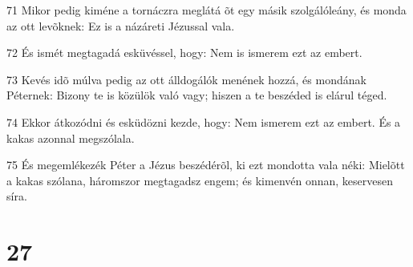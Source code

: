 \par 71 Mikor pedig kiméne a tornáczra meglátá õt egy másik szolgálóleány, és monda az ott levõknek: Ez is a názáreti Jézussal vala.
\par 72 És ismét megtagadá esküvéssel, hogy: Nem is ismerem ezt az embert.
\par 73 Kevés idõ múlva pedig az ott álldogálók menének hozzá, és mondának Péternek: Bizony te is közülök való vagy; hiszen a te beszéded is elárul téged.
\par 74 Ekkor átkozódni és esküdözni kezde, hogy: Nem ismerem ezt az embert. És a kakas azonnal megszólala.
\par 75 És megemlékezék Péter a Jézus beszédérõl, ki ezt mondotta vala néki: Mielõtt a kakas szólana, háromszor megtagadsz engem; és kimenvén onnan, keservesen síra.

\chapter{27}

